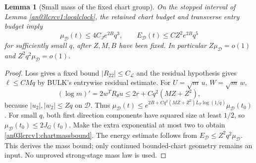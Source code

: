 \documentclass[11pt]{article}
\newtheorem{lemma}[theorem]{Lemma}
\theoremstyle{remark}\newtheorem{remark}[theorem]{Remark}
\begin{document}
\begin{lemma}[Small mass of the fixed chart group]
\label{an03lcrcv1:chartmass}
On the stopped interval of Lemma \ref{an03lcrcv1:localclock}, the
retained chart budget and transverse entry budget imply
\begin{equation}\label{an03lcrcv1:chartmassbound}
 \mu_{\mathcal D}(t)\le4C_Je^{2B}q^3,\qquad
 E_{\mathcal D}(t)\le C Z^2e^{2B}q^5
\end{equation}
for sufficiently small $q$, after $Z,M,B$ have been fixed.
In particular $Z\mu_{\mathcal D}=o(1)$ and
$Z^2q^2\mu_{\mathcal D}=o(1)$.
\end{lemma}
\begin{proof}
Loss gives a fixed bound $|R_{22}|\le C_{\mathcal L}$ and the
residual hypothesis gives $\ell\le C Mq$ by BULK's entrywise
residual estimate. For $U=\sqrt m\,u$, $W=\sqrt m\,w$,
\[
 (\log m)'=2w^TR_\theta u
 \le2r+Cq^2(MZ+Z^2),
\]
because $|u_2|,|w_2|\le Zq$ on $\mathcal D$.
Thus $\mu_{\mathcal D}(t)\le
 e^{2B+Cq^2(MZ+Z^2)L_T\log(1/q)}\mu_{\mathcal D}(t_0)$.
For small $q$, both first direction components have squared size
at least $1/2$, so $\mu_{\mathcal D}(t_0)\le2J_G(t_0)$.
Make the extra exponential at most two to obtain
\eqref{an03lcrcv1:chartmassbound}. The energy estimate follows from
$E_{\mathcal D}\le Z^2q^2\mu_{\mathcal D}$.
This derives the mass bound; only continued bounded-chart geometry
remains an input. No unproved strong-stage mass law is used.
\end{proof}
\end{document}
